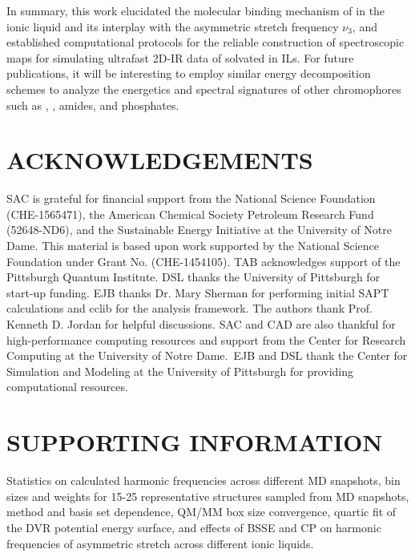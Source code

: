 \documentclass[%
  class = book,%
  crop = false,%
  float = true,%
  multi = true,%
  preview = false,%
]{standalone}
\let\cite\autocite
\newcommand{\caps}[1]{\uppercase{#1}}
\begin{document}
In summary, this work elucidated the molecular binding mechanism of  in the \ce{[C4C1im][PF6]} ionic liquid and its interplay with the  asymmetric stretch frequency \(\nu_{3}\), and established computational protocols for the reliable construction of spectroscopic maps for simulating ultrafast 2D-IR data of  solvated in ILs. For future publications, it will be interesting to employ similar energy decomposition schemes to analyze the energetics and spectral signatures of other chromophores such as , , amides, and phosphates.

\section{\texorpdfstring{\caps{Acknowledgements}}{Acknowledgements}}

SAC is grateful for financial support from the National Science Foundation (CHE-1565471), the American Chemical Society Petroleum Research Fund (52648-ND6), and the Sustainable Energy Initiative at the University of Notre Dame. This material is based upon work supported by the National Science Foundation under Grant No. (CHE-1454105). TAB acknowledges support of the Pittsburgh Quantum Institute. DSL thanks the University of Pittsburgh for start-up funding. EJB thanks Dr. Mary Sherman for performing initial SAPT calculations and cclib\cite{OBoyle2008,Berquist2015} for the analysis framework. The authors thank Prof. Kenneth D. Jordan for helpful discussions. SAC and CAD are also thankful for high-performance computing resources and support from the Center for Research Computing at the University of Notre Dame.~EJB and DSL thank the Center for Simulation and Modeling at the University of Pittsburgh for providing computational resources.

\section{\texorpdfstring{\caps{Supporting Information}}{Supporting Information}}
\label{paper_02:sec:SI}

Statistics on calculated harmonic frequencies across different MD snapshots, bin sizes and weights for 15-25 representative structures sampled from MD snapshots, method and basis set dependence, QM/MM box size convergence, quartic fit of the DVR potential energy surface, and effects of BSSE and CP on harmonic frequencies of  asymmetric stretch across different ionic liquids.
\end{document}
